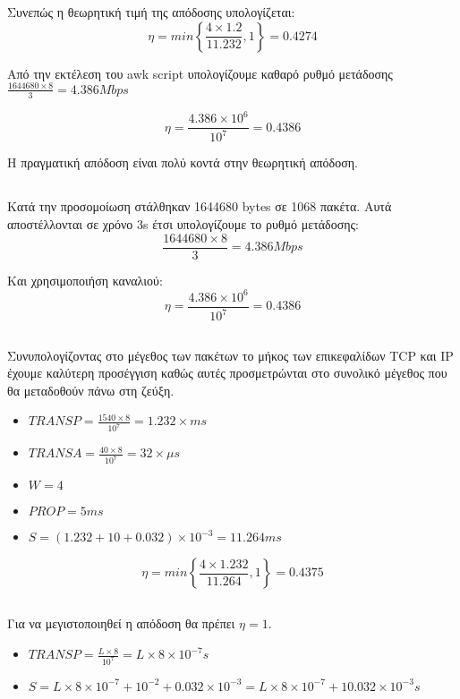 \documentclass[a4paper,9pt]{article}
\begin{document}
Συνεπώς η θεωρητική τιμή της απόδοσης υπολογίζεται:
\[\eta=min\left\{ \frac{4 \times 1.2}{11.232},1\right\} = 0.4274\]

Από την εκτέλεση του awk script υπολογίζουμε καθαρό ρυθμό μετάδοσης $\frac{1644680
\times 8}{3} = 4.386Mbps $

\[\eta=\frac{4.386 \times 10^6}{10^7} = 0.4386 \]

Η πραγματική απόδοση είναι πολύ κοντά στην θεωρητική απόδοση.

\subsection{}
Κατά την προσομοίωση στάλθηκαν 1644680 bytes σε 1068 πακέτα. Αυτά
αποστέλλονται σε χρόνο 3s έτσι υπολογίζουμε το ρυθμό μετάδοσης:
\[\frac{1644680 \times 8}{3} = 4.386Mbps \]

Και χρησιμοποιήση καναλιού:
\[\eta=\frac{4.386 \times 10^6}{10^7} = 0.4386 \]

\subsection{}
Συνυπολογίζοντας στο μέγεθος των πακέτων το μήκος των επικεφαλίδων TCP και IP
έχουμε καλύτερη προσέγγιση καθώς αυτές προσμετρώνται στο συνολικό μέγεθος που
θα μεταδοθούν πάνω στη ζεύξη.

\begin{itemize}
    \item $TRANSP = \frac{1540 \times 8}{10^7} = 1.232 \times ms$
    \item $TRANSA = \frac{40 \times 8}{10^7} = 32 \times \mu s$
    \item $W=4$
    \item $PROP = 5 ms$
    \item $S = (1.232 + 10 + 0.032) \times 10^{-3} = 11.264 ms$
\end{itemize}

\[\eta=min\left\{ \frac{4 \times 1.232}{11.264},1\right\} = 0.4375\]

\subsection{}
Για να μεγιστοποιηθεί η απόδοση θα πρέπει $\eta=1$. 

\begin{itemize}
    \item $TRANSP = \frac{L \times 8}{10^7} = L \times 8 \times 10^{-7} s$
    \item $S = L\times8\times10^{-7}+ 10^{-2} + 0.032 \times 10^{-3} =
        L\times8\times10^{-7}+10.032\times10^{-3} s$
\end{itemize}
\end{document}
